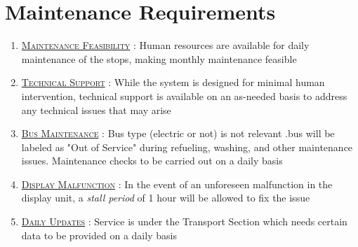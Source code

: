 \section{Maintenance Requirements}

\begin{enumerate}
    \item \underline{\textsc{Maintenance Feasibility}} : Human resources are available for daily maintenance of the stops, making monthly maintenance feasible

    \item {}\underline{\textsc{Technical Support}} : While the system is designed for minimal human intervention, technical support is available on an as-needed basis to address any technical issues that may arise

    \item \underline{\textsc{Bus Maintenance}} : Bus type (electric or not) is not relevant .bus will be labeled as "Out of Service" during refueling, washing, and other maintenance issues. Maintenance checks to be carried out on a daily basis

    \item {}\underline{\textsc{Display Malfunction}} : In the event of an unforeseen malfunction in the display unit, a \textit{\gls{stall period}} of 1 hour will be allowed to fix the issue

    \item \underline{\textsc{Daily Updates}} : Service is under the Transport Section which needs certain data to be provided on a daily basis
\end{enumerate}